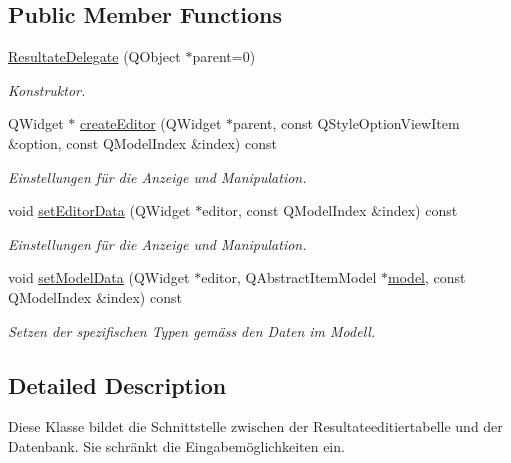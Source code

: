 \subsection*{Public Member Functions}
\begin{CompactItemize}
\item 
\hyperlink{class_resultate_delegate_3798be83d90e144dad0a2b031873a6b9}{ResultateDelegate} (QObject $\ast$parent=0)
\begin{CompactList}\small\item\em Konstruktor. \item\end{CompactList}\item 
QWidget $\ast$ \hyperlink{class_resultate_delegate_edeae75738a99f9b2fb524daddec21fe}{createEditor} (QWidget $\ast$parent, const QStyleOptionViewItem \&option, const QModelIndex \&index) const 
\begin{CompactList}\small\item\em Einstellungen für die Anzeige und Manipulation. \item\end{CompactList}\item 
void \hyperlink{class_resultate_delegate_9091c5a7c22a6041062625fba1ab5c70}{setEditorData} (QWidget $\ast$editor, const QModelIndex \&index) const 
\begin{CompactList}\small\item\em Einstellungen für die Anzeige und Manipulation. \item\end{CompactList}\item 
void \hyperlink{class_resultate_delegate_b005b8316a221b63baf1f6a153b74e35}{setModelData} (QWidget $\ast$editor, QAbstractItemModel $\ast$\hyperlink{_master_r_d_8h_234be45c406c2d8d2489673913eecfd4}{model}, const QModelIndex \&index) const 
\begin{CompactList}\small\item\em Setzen der spezifischen Typen gemäss den Daten im Modell. \item\end{CompactList}\end{CompactItemize}


\subsection{Detailed Description}
Diese Klasse bildet die Schnittstelle zwischen der Resultateeditiertabelle und der Datenbank. Sie schränkt die Eingabemöglichkeiten ein. 

